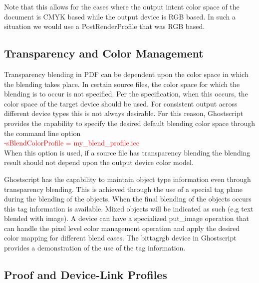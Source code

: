 \documentclass[12pt,notitlepage]{article}
\begin{document}
Note that this allows for the cases where the output intent color space of the document is CMYK based while the output device is RGB based.  In such a situation we would use a PostRenderProfile that was RGB based.

\subsection{Transparency and Color Management}
\label{sec:Transparency}
Transparency blending in PDF can be dependent upon the color space in which the blending takes place.  In certain source files, the color space for which the blending is to occur is not specified.  Per the specification, when this occurs, the color space of the target device should be used.   For consistent output across different device types this is not always desirable.   For this reason, Ghostscript provides the capability to specify the desired default blending color space through the command line option\\

\textcolor{red}{-sBlendColorProfile = my\_blend\_profile.icc}\\

\noindent When this option is used, if a source file has transparency blending the blending result should not depend upon the output device color model.

Ghostscript has the capability to maintain object type information even through transparency blending.  This is achieved through the use of a special tag plane during the blending of the objects.  When the final blending of the objects occurs this tag information is available.  Mixed objects will be indicated as such (e.g text blended with image).  A device can have a specialized put\_image operation that can handle the pixel level color management operation and apply the desired color mapping for different blend cases.  The bittagrgb device in Ghostscript provides a demonstration of the use of the tag information.

\subsection{Proof and Device-Link Profiles}
\label{sec:proof_link}
\end{document}
